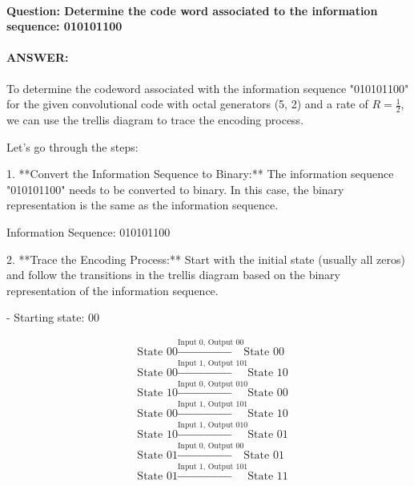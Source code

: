 \documentclass[colorlinks,11pt,a4paper,normalphoto,withhyper,ragged2e]{altareport}
\begin{document}
				
				
				
				
				
				
				\paragraph{Question: Determine the code word associated to the information sequence: 010101100}
				\paragraph{ANSWER:}
				
				To determine the codeword associated with the information sequence "010101100" for the given convolutional code with octal generators (5, 2) and a rate of \( R = \frac{1}{2} \), we can use the trellis diagram to trace the encoding process.
				
				Let's go through the steps:
				
				1. **Convert the Information Sequence to Binary:**
				The information sequence "010101100" needs to be converted to binary. In this case, the binary representation is the same as the information sequence.
				
				Information Sequence: 010101100
				
				2. **Trace the Encoding Process:**
				Start with the initial state (usually all zeros) and follow the transitions in the trellis diagram based on the binary representation of the information sequence.
				
				- Starting state: 00
				
				\[
				\begin{align*}
					&\text{State 00} \xrightarrow{\text{Input 0, Output 00}} \text{State 00} \\
					&\text{State 00} \xrightarrow{\text{Input 1, Output 101}} \text{State 10} \\
					&\text{State 10} \xrightarrow{\text{Input 0, Output 010}} \text{State 00} \\
					&\text{State 00} \xrightarrow{\text{Input 1, Output 101}} \text{State 10} \\
					&\text{State 10} \xrightarrow{\text{Input 1, Output 010}} \text{State 01} \\
					&\text{State 01} \xrightarrow{\text{Input 0, Output 00}} \text{State 01} \\
					&\text{State 01} \xrightarrow{\text{Input 1, Output 101}} \text{State 11}
				\end{align*}
				\]
				
\end{document}
